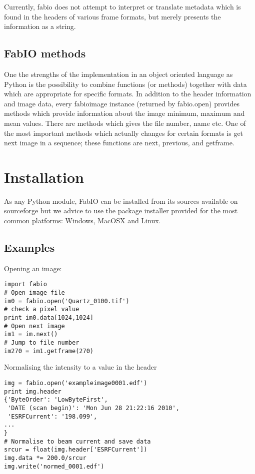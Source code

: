 \documentclass{iucr}
\begin{document}
Currently, fabio does not attempt to interpret or translate metadata which
is found in the headers of various frame formats, but merely presents the
information as a string.



\subsection{FabIO methods}

One the strengths of the implementation in an object oriented language as Python
is the possibility to combine functions (or methods) together with data which
are appropriate for specific formats.
In addition to the header information and image data, every fabioimage instance
(returned by fabio.open) provides methods which provide information about the image minimum, maximum and mean values.
There are methods which gives the file number, name etc. One of the most important methods which  actually changes for certain formats
is get next image in a sequence; these functions are next, previous, and
getframe.


\section{Installation}

As any Python module, FabIO can be installed from its sources available on sourceforge\cite{fabio}
but we advice to use the package installer provided for the most common platforms: Windows, MacOSX and Linux.

\subsection{Examples}

Opening an image:

\begin{verbatim}
import fabio
# Open image file
im0 = fabio.open('Quartz_0100.tif')
# check a pixel value
print im0.data[1024,1024]
# Open next image
im1 = im.next()
# Jump to file number
im270 = im1.getframe(270)
\end{verbatim}

Normalising the intensity to a value in the header

\begin{verbatim}
img = fabio.open('exampleimage0001.edf')
print img.header
{'ByteOrder': 'LowByteFirst',
 'DATE (scan begin)': 'Mon Jun 28 21:22:16 2010',
 'ESRFCurrent': '198.099',
...
}
# Normalise to beam current and save data
srcur = float(img.header['ESRFCurrent'])
img.data *= 200.0/srcur
img.write('normed_0001.edf')
\end{verbatim}
\end{document}
